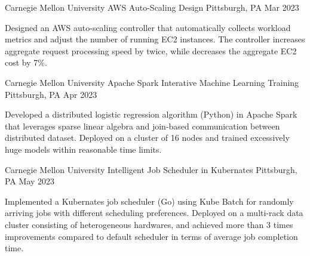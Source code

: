 

\begin{cventries}

  \cventry
    {Carnegie Mellon University} %
    {AWS Auto-Scaling Design} %
    {Pittsburgh, PA} %
    {Mar 2023} %
    {
      \begin{cvitems} %
        \item {Designed an AWS auto-scaling controller that automatically collects workload metrics 
        and adjust the number of running EC2 instances. The controller increases aggregate request 
        processing speed by twice, while decreases the aggregate EC2 cost by 7\%.}
      \end{cvitems}
    }

  \cventry
    {Carnegie Mellon University} %
    {Apache Spark Interative Machine Learning Training} %
    {Pittsburgh, PA} %
    {Apr 2023} %
    {
      \begin{cvitems} %
        \item {Developed a distributed logistic regression algorithm (Python) in Apache Spark that leverages 
        sparse linear algebra and join-based communication between distributed dataset. Deployed on a cluster 
        of 16 nodes and trained excessively huge models within reasonable time limits.}
      \end{cvitems}
    }

  \cventry
    {Carnegie Mellon University} %
    {Intelligent Job Scheduler in Kubernates} %
    {Pittsburgh, PA} %
    {May 2023} %
    {
      \begin{cvitems} %
        \item {Implemented a Kubernates job scheduler (Go) using Kube Batch for randomly arriving jobs with 
        different scheduling preferences. Deployed on a multi-rack data cluster consisting of heterogeneous 
        hardwares, and achieved more than 3 times improvements compared to default scheduler in terms of average
        job completion time.}
      \end{cvitems}
    }


\end{cventries}
